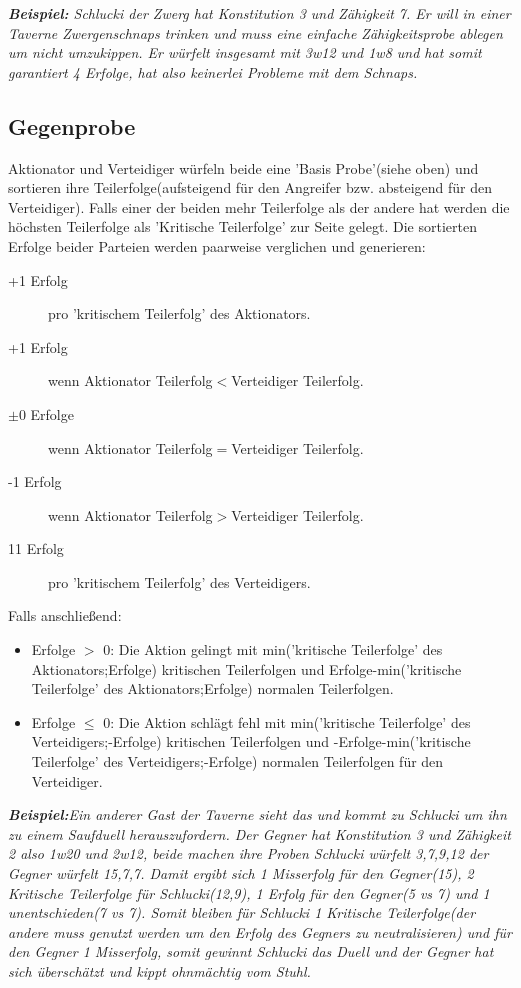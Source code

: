 \textit{\textbf{Beispiel:} 
Schlucki der Zwerg hat Konstitution 3 und Zähigkeit 7. Er will in einer Taverne Zwergenschnaps trinken und muss eine einfache Zähigkeitsprobe ablegen um nicht umzukippen. Er würfelt insgesamt mit 3w12 und 1w8 und hat somit garantiert 4 Erfolge, hat also keinerlei Probleme mit dem Schnaps. }

\subsection{Gegenprobe}

Aktionator und Verteidiger würfeln beide eine 'Basis Probe'(siehe oben) und sortieren ihre Teilerfolge(aufsteigend für den Angreifer bzw. absteigend für den Verteidiger).
Falls einer der beiden mehr Teilerfolge als der andere hat werden die höchsten Teilerfolge als 'Kritische Teilerfolge' zur Seite gelegt.
Die sortierten Erfolge beider Parteien werden paarweise verglichen und generieren:
\begin{description}
\item[+1 Erfolg] pro 'kritischem Teilerfolg' des Aktionators.
\item[+1 Erfolg] wenn Aktionator Teilerfolg$<$Verteidiger Teilerfolg.
\item[$\pm0$ Erfolge] wenn Aktionator Teilerfolg$=$Verteidiger Teilerfolg.
\item[-1 Erfolg] wenn Aktionator Teilerfolg$>$Verteidiger Teilerfolg.
\item[11 Erfolg] pro 'kritischem Teilerfolg' des Verteidigers.
\end{description}
Falls anschließend:
\begin{itemize}
\item Erfolge $>$ 0: Die Aktion gelingt mit min('kritische Teilerfolge' des Aktionators;Erfolge) kritischen Teilerfolgen und Erfolge-min('kritische Teilerfolge' des Aktionators;Erfolge) normalen Teilerfolgen.
\item Erfolge $\leq$ 0: Die Aktion schlägt fehl mit min('kritische Teilerfolge' des Verteidigers;-Erfolge) kritischen Teilerfolgen und -Erfolge-min('kritische Teilerfolge' des Verteidigers;-Erfolge) normalen Teilerfolgen für den Verteidiger.
\end{itemize}

\textit{\textbf{Beispiel:}Ein anderer Gast der Taverne sieht das und kommt zu Schlucki um ihn zu einem Saufduell herauszufordern. Der Gegner hat Konstitution 3 und Zähigkeit 2 also 1w20 und 2w12, beide machen ihre Proben Schlucki würfelt 3,7,9,12 der Gegner würfelt 15,7,7. Damit ergibt sich 1 Misserfolg für den Gegner(15), 2 Kritische Teilerfolge für Schlucki(12,9), 1 Erfolg für den Gegner(5 vs 7) und 1 unentschieden(7 vs 7). Somit bleiben für Schlucki 1 Kritische Teilerfolge(der andere muss genutzt werden um den Erfolg des Gegners zu neutralisieren) und für den Gegner 1 Misserfolg, somit gewinnt Schlucki das Duell und der Gegner hat sich überschätzt und kippt ohnmächtig vom Stuhl.}

